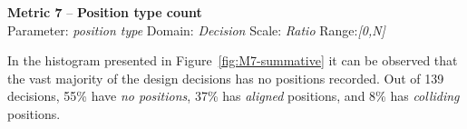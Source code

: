 \documentclass[article]{elsarticle}
\begin{document}
\clearpage
\noindent
\textbf{Metric 7} -- \textbf{Position type count}\\
Parameter: \emph{position type} Domain: \emph{Decision} Scale: \emph{Ratio} Range:\emph{[0,N]}

In the histogram presented in Figure~\ref{fig:M7-summative} it can be observed that the vast majority of the design decisions has no positions recorded. Out of 139 decisions, 55\% have \emph{no positions}, 37\% has \emph{aligned} positions, and 8\% has \emph{colliding} positions.
\begin{figure}
  \begin{center}
\begin{comment}
  \begin{tikzpicture}
	\begin{axis}[
		width=\textwidth,
		height=6cm,
	    ylabel=,
	    xtick=data,
		flexible xticklabels from table={M7.csv}{Count bucket}{col sep=tab},
	    enlarge y limits=false,
	    enlarge x limits=0.1,
	    yticklabel={\pgfmathparse{\tick}\pgfmathprintnumber{\pgfmathresult}\%},
	    ybar,
	    ymajorgrids = true,			
	    bar width=7pt,
	    legend style={
	      font=\footnotesize,
	    },
	]  
 
	\addplot+ table[x expr=\coordindex,y={Positive decisions EP}, col sep=tab] {"M7.csv"};
	\addplot+ table[x expr=\coordindex,y={Negative decisions EP}, col sep=tab] {"M7.csv"};
	\addplot+ table[x expr=\coordindex,y={Open decisions EP}, col sep=tab] {"M7.csv"};
	\addplot+ table[x expr=\coordindex,y={Any decisions EP}, col sep=tab] {"M7.csv"};
	\nextgroupplot
	\addplot+ table[x expr=\coordindex,y={Positive decisions SAW}, col sep=tab] {"M7.csv"};
	\addplot+ table[x expr=\coordindex,y={Negative decisions SAW}, col sep=tab] {"M7.csv"};
	\addplot+ table[x expr=\coordindex,y={Open decisions SAW}, col sep=tab] {"M7.csv"};
	\addplot+ table[x expr=\coordindex,y={Any decisions SAW}, col sep=tab] {"M7.csv"};
	\legend{Positive, Negative, Open, Any}     
	\end{axis} 

	\end{tikzpicture}
\end{comment}


\end{center}
\end{figure}
\end{document}
